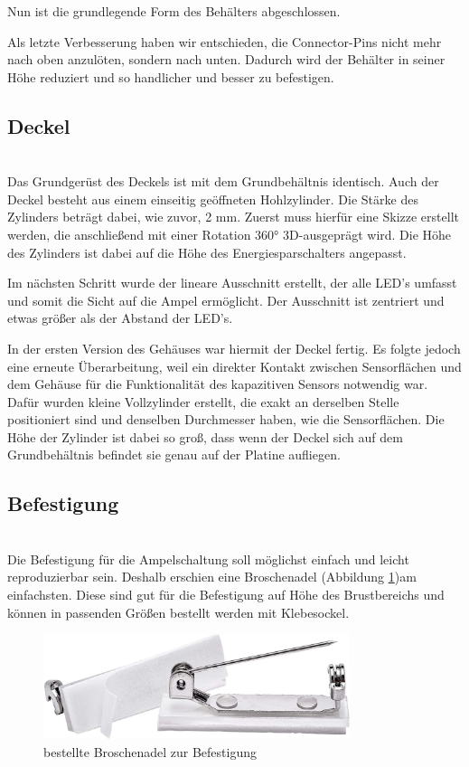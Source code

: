 \documentclass[a4paper,
DIV=13,
12pt,
BCOR=10mm,
department=FakEI,
parskip=half,
automark,
]{article}
\begin{document}
Nun ist die grundlegende Form des Behälters abgeschlossen. 

Als letzte Verbesserung haben wir entschieden, die Connector-Pins nicht mehr nach oben anzulöten, sondern nach unten. Dadurch wird der Behälter in seiner Höhe reduziert und so handlicher und besser zu befestigen. 

\subsection{Deckel} $~$ \\

Das Grundgerüst des Deckels ist mit dem Grundbehältnis identisch. Auch der Deckel besteht aus einem einseitig geöffneten Hohlzylinder. Die Stärke des Zylinders beträgt dabei, wie zuvor, 2 mm. Zuerst muss hierfür eine Skizze erstellt werden, die anschließend mit einer Rotation 360° 3D-ausgeprägt wird. Die Höhe des Zylinders ist dabei auf die Höhe des Energiesparschalters angepasst. 

Im nächsten Schritt wurde der lineare Ausschnitt erstellt, der alle LED's umfasst und somit die Sicht auf die Ampel ermöglicht. Der Ausschnitt ist zentriert und etwas größer als der Abstand der LED's. 

In der ersten Version des Gehäuses war hiermit der Deckel fertig. Es folgte jedoch eine erneute Überarbeitung, weil ein direkter Kontakt zwischen Sensorflächen und dem Gehäuse für die Funktionalität des kapazitiven Sensors notwendig war. Dafür wurden kleine Vollzylinder erstellt, die exakt an derselben Stelle positioniert sind und denselben Durchmesser haben, wie die Sensorflächen. Die Höhe der Zylinder ist dabei so groß, dass wenn der Deckel sich auf dem Grundbehältnis befindet sie genau auf der Platine aufliegen.  

\subsection{Befestigung} $~$ \\

Die Befestigung für die Ampelschaltung soll möglichst einfach und leicht reproduzierbar sein. Deshalb erschien eine Broschenadel (Abbildung \ref{fig:Nadel})am einfachsten. Diese sind gut für die Befestigung auf Höhe des Brustbereichs und können in passenden Größen bestellt werden mit Klebesockel. 

\begin{figure}[!hbpt]
 \begin{center} \includegraphics[width=0.8\textwidth]{Broschenadel.jpg}
 \caption{bestellte Broschenadel zur Befestigung \cite{Broschenadel}}
 \label{fig:Nadel}
  \end{center}
\end{figure}
\end{document}
